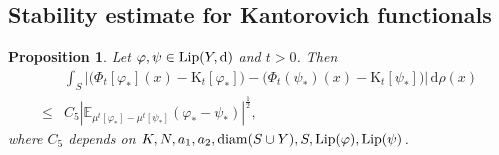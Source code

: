 \documentclass[a4paper,11pt]{article}
\numberwithin{equation}{section}
\theoremstyle{plain}
\newtheorem{corollary}[theorem]{Corollary}
\newtheorem{proposition}[theorem]{Proposition}
\theoremstyle{definition}
\theoremstyle{remark}
\newcommand{\mm}{\mathfrak m}
\newcommand{\E}{\mathbb{E}}
\newcommand{\K}{\mathrm{K}}
\newcommand{\diam}{\mathop{\rm diam}\nolimits}
\newcommand{\Lip}{\mathop{\rm Lip}\nolimits}
\renewcommand{\d}{{\mathrm d}}
\begin{document}
	


	
	\subsection{Stability estimate for Kantorovich functionals}

	\begin{proposition}\label{0.30}
	Let $\varphi, \psi\in \Lip(Y, \d)$ and $t>0$.  Then
		\begin{equation}
			\begin{aligned}
				&\int_{S}\left|\Big(\Phi_t[\varphi_{*}](x)-\K_t[\varphi_{*}]\Big)-\Big(\Phi_t(\psi_{*})(x)-\K_t[\psi_{*}]\Big)\right|\,\d\rho(x)\\
				\leq &C_5 \left| \E_{\mu^t[\varphi_{*}]-\mu^t[\psi_{*}]}(\varphi_{*}-\psi_{*})\right|^\frac{1}{2},
			\end{aligned}
		\end{equation}
		where $C_5$ depends on $K,N,a_1,a_2,\diam(S\cup Y),S,  \Lip(\varphi),  \Lip(\psi)$.
	\end{proposition}
	
\end{document}

